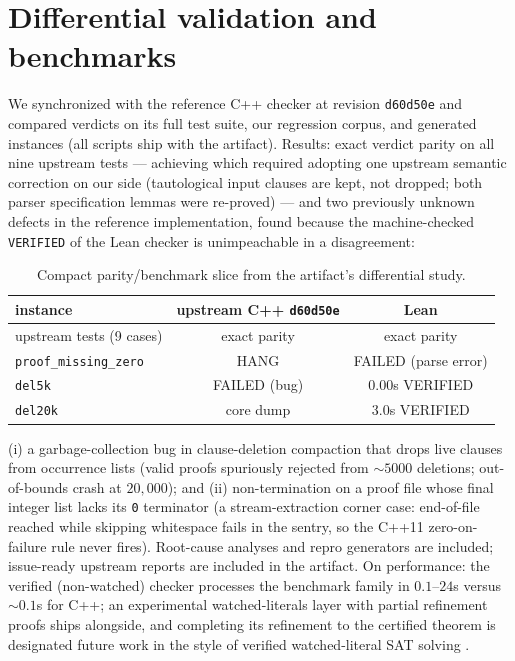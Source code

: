 \documentclass{article}
\begin{document}
\section{Differential validation and benchmarks}\label{sec:differential}
We synchronized with the reference C++ checker at revision \texttt{d60d50e} and
compared verdicts on its full test suite, our regression corpus, and
generated instances (all scripts ship with the artifact). Results: exact
verdict parity on all nine upstream tests --- achieving which required
adopting one upstream semantic correction on our side (tautological input
clauses are kept, not dropped; both parser specification lemmas were
re-proved) --- and two previously unknown defects in the reference
implementation, found because the machine-checked \texttt{VERIFIED} of the
Lean checker is unimpeachable in a disagreement:
\begin{table}[t]
\centering
\small
\begin{tabular}{lcc}
\toprule
instance & upstream C++ \texttt{d60d50e} & Lean \\
\midrule
upstream tests (9 cases) & exact parity & exact parity \\
\texttt{proof\_missing\_zero} & HANG & FAILED (parse error) \\
\texttt{del5k} & FAILED (bug) & 0.00s VERIFIED \\
\texttt{del20k} & core dump & 3.0s VERIFIED \\
\bottomrule
\end{tabular}
\caption{Compact parity/benchmark slice from the artifact's differential study.}
\end{table}
(i) a garbage-collection bug in clause-deletion compaction that drops live
clauses from occurrence lists (valid proofs spuriously rejected from
${\sim}5000$ deletions; out-of-bounds crash at $20{,}000$); and
(ii) non-termination on a proof file whose final integer list lacks its
\texttt{0} terminator (a stream-extraction corner case: end-of-file reached
while skipping whitespace fails in the sentry, so the C++11
zero-on-failure rule never fires). Root-cause analyses and repro generators
are included; issue-ready upstream reports are included in the artifact. On performance: the verified
(non-watched) checker processes the benchmark family in $0.1$--$24$s
versus ${\sim}0.1$s for C++; an experimental watched-literals layer with
partial refinement proofs ships alongside, and completing its refinement to
the certified theorem is designated future work in the style of verified
watched-literal SAT solving \cite{BlanchetteFleuryWeidenbach2018}.
\end{document}
